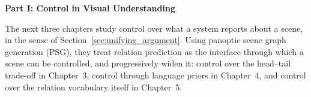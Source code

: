 
\cleardoublepage
{}
{}
\thispagestyle{plain}

\vspace*{\fill}
\begin{center}
{\Huge\bfseries Part I: Control in Visual Understanding\par}
\vspace{1.5cm}
\begin{minipage}{0.8\textwidth}
\centering
The next three chapters study control over what a system reports about a scene, in the sense of Section~\ref{sec:unifying_argument}. Using panoptic scene graph generation (PSG), they treat relation prediction as the interface through which a scene can be controlled, and progressively widen it: control over the head--tail trade-off in Chapter~3, control through language priors in Chapter~4, and control over the relation vocabulary itself in Chapter~5.
\end{minipage}
\end{center}
\vspace*{\fill}

\clearpage
